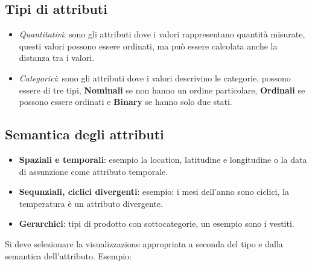 \subsection{Tipi di attributi}
\begin{itemize}
    \item \textit{Quantitativi}: sono gli attributi dove i valori rappresentano quantità misurate, 
        questi valori possono essere ordinati, ma può essere calcolata anche la distanza tra i valori.
    \item  \textit{Categorici}: sono gli attributi dove i valori descrivino le categorie,
        possono essere di tre tipi, \textbf{Nominali} se non hanno un ordine particolare, \textbf{Ordinali} se possono essere ordinati e
        \textbf{Binary} se hanno solo due stati.
\end{itemize}
\subsection{Semantica degli attributi}
\begin{itemize}
    \item \textbf{Spaziali e temporali}: esempio la location, latitudine e longitudine o la data di assunzione come attributo temporale.
    \item \textbf{Sequnziali, ciclici divergenti}: esempio: i mesi dell'anno sono ciclici, la temperatura è un attributo divergente.
    \item \textbf{Gerarchici}: tipi di prodotto con sottocategorie, un esempio sono i vestiti.
\end{itemize}
Si deve selezionare la visualizzazione appropriata a seconda del tipo e dalla semantica dell'attributo.
Esempio:
